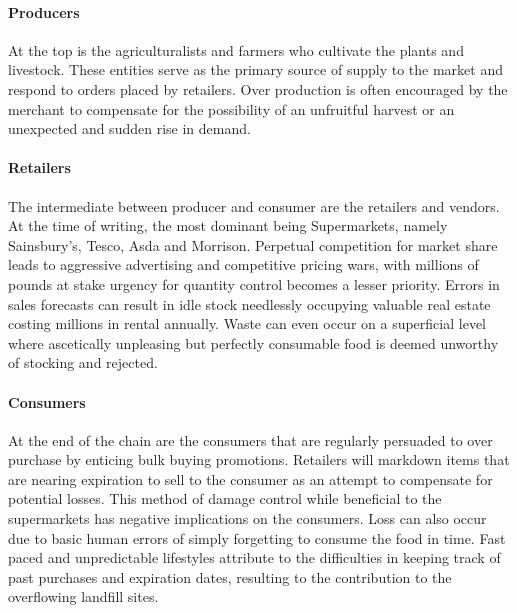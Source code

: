 \documentclass[a4paper, 11pt]{article}
\begin{document}
\paragraph{Producers}At the top is the agriculturalists and farmers who cultivate the plants and livestock. These entities serve as the primary source of supply to the market and respond to orders placed by retailers. Over production is often encouraged by the merchant to compensate for the possibility of an unfruitful harvest or an unexpected and sudden rise in demand.\cite{waste} 

\paragraph{Retailers}The intermediate between producer and consumer are the retailers and vendors. At the time of writing, the most dominant being Supermarkets, namely Sainsbury's, Tesco, Asda and Morrison. Perpetual competition for market share leads to aggressive advertising and competitive pricing wars, with millions of pounds at stake urgency for quantity control becomes a lesser priority. Errors in sales forecasts can result in idle stock needlessly occupying valuable real estate costing millions in rental annually. Waste can even occur on a superficial level where ascetically unpleasing but perfectly consumable food is deemed unworthy of stocking and rejected.\cite{FoodWaste} 

\paragraph{Consumers}At the end of the chain are the consumers that are regularly persuaded to over purchase by enticing bulk buying promotions. Retailers will markdown items that are nearing expiration to sell to the consumer as an attempt to compensate for potential losses. This method of damage control while beneficial to the supermarkets has negative implications on the consumers. Loss can also occur due to basic human errors of simply forgetting to consume the food in time. Fast paced and unpredictable lifestyles attribute to the difficulties in keeping track of past purchases and expiration dates, resulting to the contribution to the overflowing landfill sites.\cite{FoodWaste} 

\vspace{\baselineskip}
\end{document}
